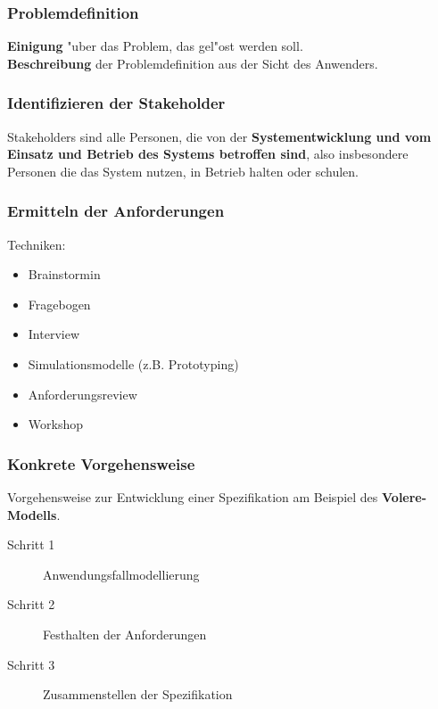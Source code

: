 \subsubsection{Problemdefinition}
\textbf{Einigung} "uber das Problem, das gel"ost werden soll.\\
\textbf{Beschreibung} der Problemdefinition aus der Sicht des Anwenders.\\

\subsubsection{Identifizieren der Stakeholder}
Stakeholders sind alle Personen, die von der \textbf{Systementwicklung und vom Einsatz und Betrieb des Systems betroffen sind}, also insbesondere Personen die das System nutzen, in Betrieb halten oder schulen.\\


\subsubsection{Ermitteln der Anforderungen}
Techniken:
\begin{itemize}
    \item Brainstormin
    \item Fragebogen
    \item Interview
    \item Simulationsmodelle (z.B. Prototyping)
    \item Anforderungsreview
    \item Workshop
\end{itemize}

\subsubsection{Konkrete Vorgehensweise}

Vorgehensweise zur Entwicklung einer Spezifikation am Beispiel des \textbf{Volere-Modells}.\\
\begin{description}
    \item[Schritt 1] Anwendungsfallmodellierung
    \item[Schritt 2] Festhalten der Anforderungen
    \item[Schritt 3] Zusammenstellen der Spezifikation
\end{description}

